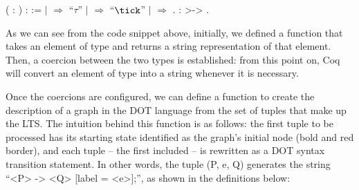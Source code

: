 \begin{coqdoccode}
	\coqdocnoindent
	  ( : ) :  :=\coqdoceol
	\coqdocindent{1.00em}
	  \coqdoceol
	\coqdocindent{1.00em}
	\ensuremath{|}  \ensuremath{\Rightarrow} ``$ \tau $''\coqdoceol
	\coqdocindent{1.00em}
	\ensuremath{|}  \ensuremath{\Rightarrow} ``$ \tick $''\coqdoceol
	\coqdocindent{1.00em}
	\ensuremath{|}   \ensuremath{\Rightarrow} \coqdoceol
	\coqdocindent{1.00em}
	.\coqdoceol
	\coqdocemptyline
	\coqdocnoindent
	  :  >-> .\coqdoceol
\end{coqdoccode}

As we can see from the code snippet above, initially, we defined a function that takes an element of type  and returns a string representation of that element. Then, a coercion between the two types is established: from this point on, Coq will convert an element of type  into a string whenever it is necessary.

Once the coercions are configured, we can define a function to create the description of a graph in the DOT language from the set of tuples that make up the LTS. The intuition behind this function is as follows: the first tuple to be processed has its starting state identified as the graph's initial node (bold and red border), and each tuple -- the first included -- is rewritten as a DOT syntax transition statement. In other words, the tuple (P, e, Q) generates the string ``<P> -> <Q> [label = <e>];'', as shown in the definitions below:

